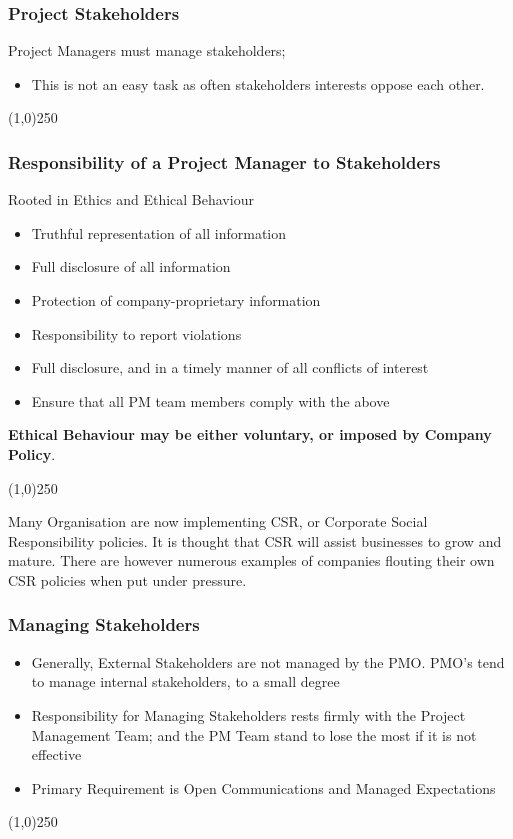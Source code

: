 \begin{frame}
\frametitle{Project Stakeholders}
Project Managers must manage stakeholders; \\
\begin{itemize}
	\item This is not an easy task as often stakeholders interests oppose each other.
\end{itemize}
\end{frame}
\begin{center}\line(1,0){250}\end{center}



\begin{frame}
\frametitle{Responsibility of a Project Manager to Stakeholders}
Rooted in Ethics and Ethical Behaviour\\
\begin{itemize}
\item Truthful representation of all information
\item Full disclosure of all information
\item Protection of company-proprietary information
\item Responsibility to report violations
\item Full disclosure, and in a timely manner of all conflicts of interest
\item Ensure that all PM team members comply with the above
\end{itemize}
\textbf{Ethical Behaviour may be either voluntary, or imposed by Company Policy}.\\
\end{frame}
\begin{center}\line(1,0){250}\end{center}
Many Organisation are now implementing CSR, or Corporate Social Responsibility policies.  It is thought that CSR will assist businesses to grow and mature.  There are however numerous examples of companies flouting their own CSR policies when put under pressure.




\begin{frame}
\frametitle{Managing Stakeholders}
\begin{itemize}
	\item Generally, External Stakeholders are not managed by the PMO.  PMO's tend to manage internal stakeholders, to a small degree
	\item Responsibility for Managing Stakeholders rests firmly with the Project Management Team; and the PM Team stand to lose the most if it is not effective
	\item Primary Requirement is Open Communications and Managed Expectations
\end{itemize}
\end{frame}
\begin{center}\line(1,0){250}\end{center}




